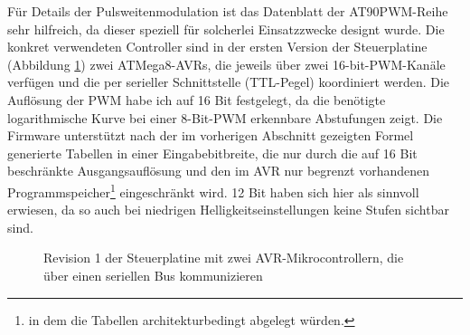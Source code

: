 \documentclass[12pt,a4paper,notitlepage]{article}
\begin{document}
Für Details der Pulsweitenmodulation ist das Datenblatt der AT90PWM-Reihe sehr hilfreich, da dieser speziell für solcherlei Einsatzzwecke designt wurde\cite{ATMEL2}. Die konkret verwendeten Controller sind in der ersten Version der Steuerplatine (Abbildung \ref{controller_rev1}) zwei ATMega8-AVRs, die jeweils über zwei 16-bit-PWM-Kanäle verfügen und die per serieller Schnittstelle (TTL-Pegel) koordiniert werden. Die Auflösung der PWM habe ich auf 16 Bit festgelegt, da die benötigte logarithmische Kurve bei einer 8-Bit-PWM erkennbare Abstufungen zeigt. Die Firmware unterstützt nach der im vorherigen Abschnitt %
gezeigten Formel generierte Tabellen in einer Eingabebitbreite, die nur durch die auf 16 Bit beschränkte Ausgangsauflösung und den im AVR nur begrenzt vorhandenen Programmspeicher\footnote{in dem die Tabellen architekturbedingt abgelegt würden.} eingeschränkt wird. 12 Bit haben sich hier als sinnvoll erwiesen, da so auch bei %
niedrigen Helligkeitseinstellungen keine Stufen sichtbar sind.

\begin{figure}
\centering
{}
\caption{Revision 1 der Steuerplatine mit zwei AVR-Mikrocontrollern, die über einen seriellen Bus kommunizieren}
\label{controller_rev1}
\end{figure}
\end{document}
